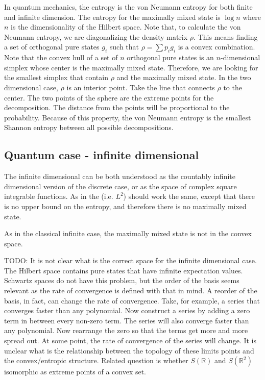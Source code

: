 In quantum mechanics, the entropy is the von Neumann entropy for both finite and infinite dimension. The entropy for the maximally mixed state is $\log n$ where $n$ is the dimensionality of the Hilbert space. Note that, to calculate the von Neumann entropy, we are diagonalizing the density matrix $\rho$. This means finding a set of orthogonal pure states $g_i$ such that $\rho = \sum p_i g_i$ is a convex combination. Note that the convex hull of a set of $n$ orthogonal pure states is an $n$-dimensional simplex whose center is the maximally mixed state. Therefore, we are looking for the smallest simplex that contain $\rho$ and the maximally mixed state. In the two dimensional case, $\rho$ is an interior point. Take the line that connects $\rho$ to the center. The two points of the sphere are the extreme points for the decomposition. The distance from the points will be proportional to the probability. Because of this property, the von Neumann entropy is the smallest Shannon entropy between all possible decompositions.


\subsection{Quantum case - infinite dimensional}

The infinite dimensional can be both understood as the countably infinite dimensional version of the discrete case, or as the space of complex square integrable functions. As in the  (i.e. $L^2$) should work the same, except that there is no upper bound on the entropy, and therefore there is no maximally mixed state.

As in the classical infinite case, the maximally mixed state is not in the convex space.

TODO: It is not clear what is the correct space for the infinite dimensional case. The Hilbert space contains pure states that have infinite expectation values. Schwartz spaces do not have this problem, but the order of the basis seems relevant as the rate of convergence is defined with that in mind. A reorder of the basis, in fact, can change the rate of convergence. Take, for example, a series that converges faster than any polynomial. Now construct a series by adding a zero term in between every non-zero term. The series will also converge faster than any polynomial. Now rearrange the zero so that the terms get more and more spread out. At some point, the rate of convergence of the series will change. It is unclear what is the relationship between the topology of these limits points and the convex/entropic structure. Related question is whether $S(\mathbb{R})$ and $S(\mathbb{R}^2)$ isomorphic as extreme points of a convex set.


